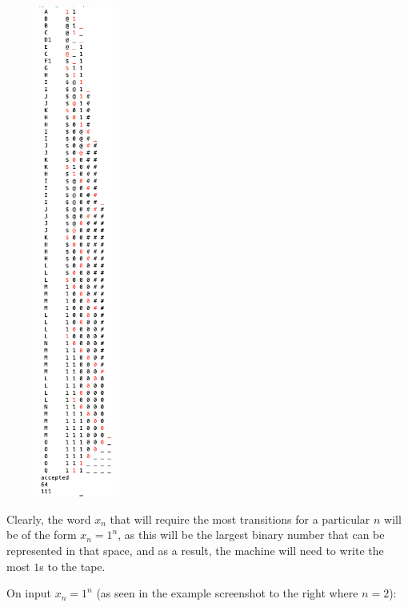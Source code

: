 \begin{figure}
    \centering
    \includegraphics[width=2.5cm]{images/screenshots/binaryunary.png}
    \vspace{-5cm}
\end{figure}

Clearly, the word $x_n$ that will require the most transitions for a particular $n$ will be of the form $x_n=1^n$, as this will be the largest binary number that can be represented in that space, and as a result, the machine will need to write the most $1$s to the tape.

On input $x_n=1^n$ (as seen in the example screenshot to the right where $n=2$):

